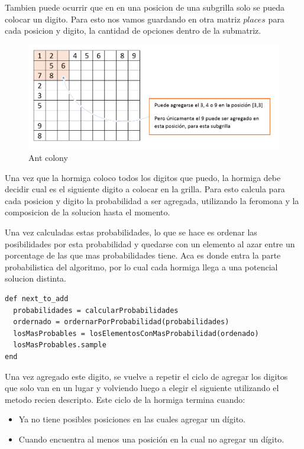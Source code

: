 Tambien puede ocurrir que en en una posicion de una subgrilla solo se pueda 
colocar un digito. Para esto nos vamos guardando en otra matriz $places$ para 
cada posicion y digito, la cantidad de opciones dentro de la submatriz.

\begin{figure}[h]
	\centering
	\includegraphics[scale=0.4]{./img/undigitosolo.png}
	\caption{Ant colony}
	\label{img:soloundigito}
\end{figure}

Una vez que la hormiga coloco todos los digitos que puedo, la hormiga debe 
decidir cual es el siguiente digito a colocar en la grilla. Para esto calcula 
para cada posicion y digito la probabilidad a ser agregada, utilizando la 
feromona y la composicion de la solucion hasta el momento. 

Una vez calculadas estas probabilidades, lo que se hace es ordenar las 
posibilidades por esta probabilidad y quedarse con un elemento al azar entre un 
porcentage de las que mas probabilidades tiene. Aca es donde entra la parte 
probabilistica del algoritmo, por lo cual cada hormiga llega a una potencial 
solucion distinta.


\begin{Verbatim}[samepage=true]
def next_to_add
  probabilidades = calcularProbabilidades
  ordernado = ordernarPorProbabilidad(probabilidades)
  losMasProbables = losElementosConMasProbabilidad(ordenado)
  losMasProbables.sample
end
\end{Verbatim}


Una vez agregado este digito, se vuelve a repetir el ciclo de agregar los 
digitos que solo van en un lugar y volviendo luego a elegir el siguiente utilizando el metodo recien descripto.
Este ciclo de la hormiga termina cuando:

\begin{itemize}
	\item Ya no tiene posibles posiciones en las cuales agregar un dígito.
	\item Cuando encuentra al menos una posición en la cual no agregar un dígito.
\end{itemize}

